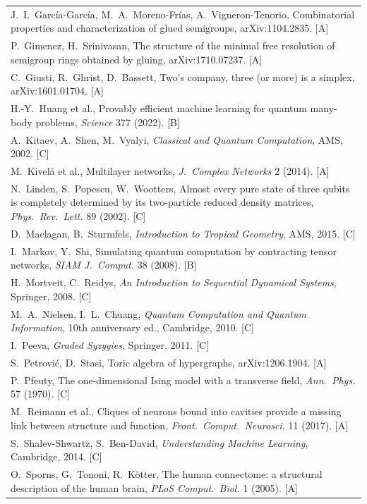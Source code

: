 \documentclass[11pt,a4paper]{article}
\newcommand{\gr}[1]{\textsf{[#1]}}
\begin{document}
\begin{tabular}{@{}p{}@{}}
J.~I.~García-García, M.~A.~Moreno-Frías, A.~Vigneron-Tenorio, Combinatorial properties and characterization of glued semigroups, arXiv:1104.2835. \gr{A}\\
P.~Gimenez, H.~Srinivasan, The structure of the minimal free resolution of semigroup rings obtained by gluing, arXiv:1710.07237. \gr{A}\\
C.~Giusti, R.~Ghrist, D.~Bassett, Two's company, three (or more) is a simplex, arXiv:1601.01704. \gr{A}\\
H.-Y.~Huang et al., Provably efficient machine learning for quantum many-body problems, \emph{Science} 377 (2022). \gr{B}\\
A.~Kitaev, A.~Shen, M.~Vyalyi, \emph{Classical and Quantum Computation}, AMS, 2002. \gr{C}\\
M.~Kivelä et al., Multilayer networks, \emph{J.\ Complex Networks} 2 (2014). \gr{A}\\
N.~Linden, S.~Popescu, W.~Wootters, Almost every pure state of three qubits is completely determined by its two-particle reduced density matrices, \emph{Phys.\ Rev.\ Lett.} 89 (2002). \gr{C}\\
D.~Maclagan, B.~Sturmfels, \emph{Introduction to Tropical Geometry}, AMS, 2015. \gr{C}\\
I.~Markov, Y.~Shi, Simulating quantum computation by contracting tensor networks, \emph{SIAM J.\ Comput.} 38 (2008). \gr{B}\\
H.~Mortveit, C.~Reidys, \emph{An Introduction to Sequential Dynamical Systems}, Springer, 2008. \gr{C}\\
M.~A.~Nielsen, I.~L.~Chuang, \emph{Quantum Computation and Quantum Information}, 10th anniversary ed., Cambridge, 2010. \gr{C}\\
I.~Peeva, \emph{Graded Syzygies}, Springer, 2011. \gr{C}\\
S.~Petrović, D.~Stasi, Toric algebra of hypergraphs, arXiv:1206.1904. \gr{A}\\
P.~Pfeuty, The one-dimensional Ising model with a transverse field, \emph{Ann.\ Phys.} 57 (1970). \gr{C}\\
M.~Reimann et al., Cliques of neurons bound into cavities provide a missing link between structure and function, \emph{Front.\ Comput.\ Neurosci.} 11 (2017). \gr{A}\\
S.~Shalev-Shwartz, S.~Ben-David, \emph{Understanding Machine Learning}, Cambridge, 2014. \gr{C}\\
O.~Sporns, G.~Tononi, R.~Kötter, The human connectome: a structural description of the human brain, \emph{PLoS Comput.\ Biol.} 1 (2005). \gr{A}\\

\end{tabular}
\end{document}
